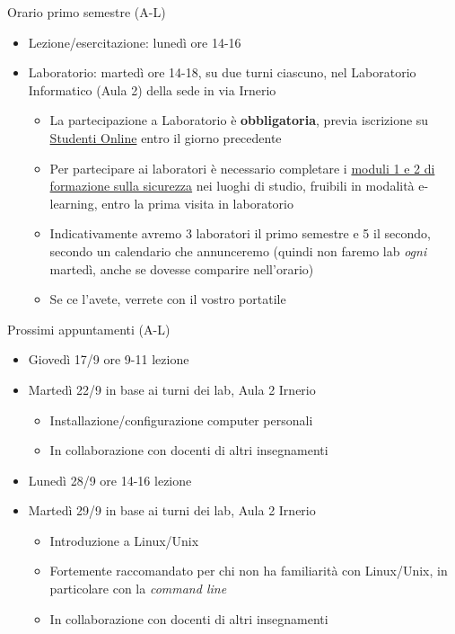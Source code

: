 \begin{frame}{Orario primo semestre (A-L)}
  \begin{itemize}
  \item Lezione/esercitazione: lunedì ore 14-16
  \item Laboratorio: martedì ore 14-18, su due
    turni ciascuno, nel Laboratorio Informatico (Aula 2) della sede in via Irnerio
    \begin{itemize}
    \item La partecipazione a Laboratorio è \textbf{obbligatoria}, previa
      iscrizione su \href{https://studenti.unibo.it/sol/}{Studenti Online}
      entro il giorno precedente
    \item Per partecipare ai laboratori è necessario completare i
      \href{https://site.unibo.it/tutela-promozione-salute-sicurezza/it/corsi-di-formazione/formazione-obbligatoria-su-sicurezza-e-salute-per-svolgimento-di-tirocinio-tesi-laboratorio}{moduli
        1 e 2 di formazione sulla sicurezza} nei luoghi di studio, fruibili in
      modalità e-learning, entro la prima visita in laboratorio
    \item Indicativamente avremo 3 laboratori il primo semestre e 5 il secondo,
      secondo un calendario che annunceremo (quindi non faremo lab \textit{ogni}
      martedì, anche se dovesse comparire nell'orario)
    \item Se ce l'avete, verrete con il vostro portatile
    \end{itemize}
  \end{itemize}
\end{frame}

\begin{frame}{Prossimi appuntamenti (A-L)}

  \begin{itemize}
  \item Giovedì 17/9 ore 9-11 lezione
  \item Martedì 22/9 in base ai turni dei lab, Aula 2 Irnerio
    \begin{itemize}
    \item Installazione/configurazione computer personali
    \item In collaborazione con docenti di altri insegnamenti
    \end{itemize}
  \item Lunedì 28/9 ore 14-16 lezione
  \item Martedì 29/9 in base ai turni dei lab, Aula 2 Irnerio
    \begin{itemize}
    \item Introduzione a Linux/Unix
    \item Fortemente raccomandato per chi non ha familiarità con Linux/Unix, in
      particolare con la \textit{command line}
    \item In collaborazione con docenti di altri insegnamenti
    \end{itemize}
  \end{itemize}

\end{frame}

